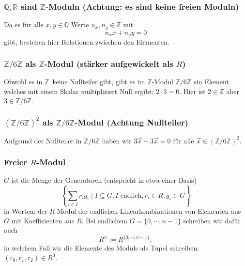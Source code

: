 \documentclass[a4paper]{amsart}
\theoremstyle{definition}
\newcommand{\R}{\ensuremath{\mathbb{ R }}}
\newcommand{\Q}{\ensuremath{\mathbb{ Q }}}
\newcommand{\Z}{\ensuremath{\mathbb{ Z }}}
\newcommand{\zz}[1]{\ensuremath{\Z /#1\Z}}
\begin{document}
\subsubsection{$\Q, \R$ sind $\Z$-Moduln (Achtung: es sind keine freien Moduln)}
Da es für alle $x,y \in \Q$ Werte $n_x, n_y \in \Z$ mit
\begin{equation}
   n_xx + n_yy = 0
\end{equation}
gibt, bestehen hier Relationen zwischen den Elementen.

\subsubsection{\zz6 als \Z-Modul (stärker aufgewickelt als $R$)}
Obwohl es in \Z\ keine Nullteiler gibt, gibt es im \Z-Modul \zz6 ein Element welches mit einem Skalar multipliziert Null ergibt: $2 \cdot 3 = 0$. Hier ist $2 \in \Z$ aber $3 \in \zz6$.

\subsubsection{$(\zz6)^2$ als \zz6-Modul (Achtung Nullteiler)}
Aufgrund der Nullteiler in \zz6 haben wir $3\vec{x} + 3\vec{x} = 0$ für alle $\vec x \in (\zz6)^2$.

\subsubsection{Freier $R$-Modul}
$G$ ist die Menge der Generatoren (entspricht in etwa einer Basis)
\begin{equation}
   \left \{ \sum_{i \in I} r_i g_i \mid I \subseteq G, I \text{ endlich}, r_i \in R, g_i \in G \right \}
\end{equation}
in Worten: der $R$-Modul der endlichen Linearkombinationen von Elementen aus $G$ mit Koeffizienten aus $R$. Bei endlichem $G = \{0, \cdots, n-1 \}$ schreiben wir dafür auch
\begin{equation}
   R^n := R^{\{0, \cdots, n-1 \}},
\end{equation}
in welchem Fall wir die Elemente des Moduls als Tupel schreiben: $(r_0, r_1, r_2) \in R^3$.
\end{document}

